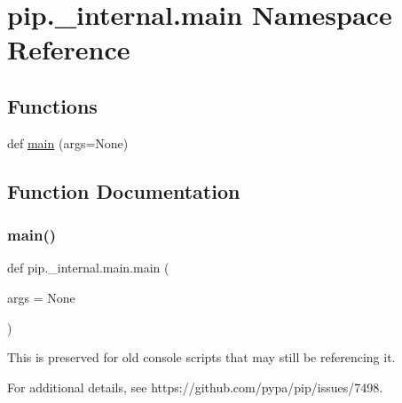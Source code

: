 \hypertarget{namespacepip_1_1__internal_1_1main}{}\section{pip.\+\_\+internal.\+main Namespace Reference}
\label{namespacepip_1_1__internal_1_1main}
\subsection*{Functions}
\begin{DoxyCompactItemize}
\item 
def \hyperlink{namespacepip_1_1__internal_1_1main_a7a98bd6406b7ffedc57ca6190e2770b6}{main} (args=None)
\end{DoxyCompactItemize}


\subsection{Function Documentation}
\mbox{\label{namespacepip_1_1__internal_1_1main_a7a98bd6406b7ffedc57ca6190e2770b6}} 
\subsubsection{\texorpdfstring{main()}{main()}}
{\footnotesize\ttfamily def pip.\+\_\+internal.\+main.\+main (\begin{DoxyParamCaption}\item[{}]{args = {\ttfamily None} }\end{DoxyParamCaption})}

\begin{DoxyVerb}This is preserved for old console scripts that may still be referencing
it.

For additional details, see https://github.com/pypa/pip/issues/7498.
\end{DoxyVerb}
 